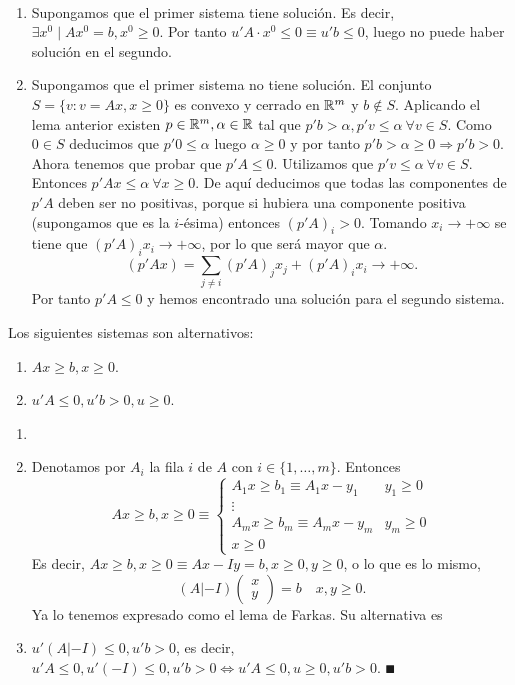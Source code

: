 \documentclass[PM.tex]{subfiles}
\begin{document}
\begin{dem}\
\begin{enumerate}
\item Supongamos que el primer sistema tiene solución. Es decir, $\exists x^0\mid Ax^0=b, x^0\geq 0$. Por tanto $u'A\cdot x^0\leq 0\equiv u'b\leq 0$, luego no puede haber solución en el segundo.
\item Supongamos que el primer sistema no tiene solución. El conjunto $S=\{v: v=Ax,x\geq 0\}$ es convexo y cerrado en $\mathbb{R}^m$ y $b\not\in S$. Aplicando el lema anterior existen $p\in\mathbb{R}^m,\alpha\in\mathbb{R}$ tal que $p'b>\alpha, p'v\leq\alpha\ \forall v\in S$. Como $0\in S$ deducimos que $p'0\leq\alpha$ luego $\alpha\geq 0$ y por tanto $p'b>\alpha\geq 0\Rightarrow p'b>0$. Ahora tenemos que probar que $p'A\leq 0$. Utilizamos que $p'v\leq\alpha\ \forall v\in S$. Entonces $p'Ax\leq\alpha\ \forall x\geq 0$. De aquí deducimos que todas las componentes de $p'A$ deben ser no positivas, porque si hubiera una componente positiva (supongamos que es la $i$-ésima) entonces $(p'A)_i>0$. Tomando $x_i\rightarrow +\infty$ se tiene que $(p'A)_ix_i\rightarrow +\infty$, por lo que será mayor que $\alpha$.
\[
(p'Ax)=\sum_{j\neq i}(p'A)_jx_j + (p'A)_ix_i \rightarrow +\infty.
\]
Por tanto  $p'A\leq 0$ y hemos encontrado una solución para el segundo sistema.
\end{enumerate}
\end{dem}

\begin{coro}
Los siguientes sistemas son alternativos:
\begin{enumerate}
\item $Ax\geq b, x\geq 0$.
\item $u'A\leq 0, u'b>0, u\geq 0$. 
\end{enumerate}
\end{coro}
\begin{dem}
\begin{enumerate}
\item[]
\item Denotamos por $A_i$ la fila $i$ de $A$ con $i\in\{1,\dots,m\}$. Entonces 
\[
Ax\geq b, x\geq 0 \equiv\begin{cases}
A_1x\geq b_1\equiv A_1x-y_1 & y_1\geq 0\\
\vdots & \\
A_mx\geq b_m\equiv A_mx-y_m & y_m\geq 0\\
x\geq 0 & 
\end{cases}
\]
Es decir, $Ax\geq b, x\geq 0 \equiv Ax-Iy=b, x\geq 0, y\geq 0$, o lo que es lo mismo,
\[(A| -I)\begin{pmatrix}
x\\
y
\end{pmatrix}=b\quad x,y\geq 0.
\]
Ya lo tenemos expresado como el lema de Farkas. Su alternativa es 
\item $u'(A| -I)\leq 0, u'b>0$, es decir, $u'A\leq 0, u'(-I)\leq 0, u'b>0 \Leftrightarrow u'A\leq 0, u\geq 0, u'b>0$. $\QED$
\end{enumerate}
\end{dem}
\end{document}
